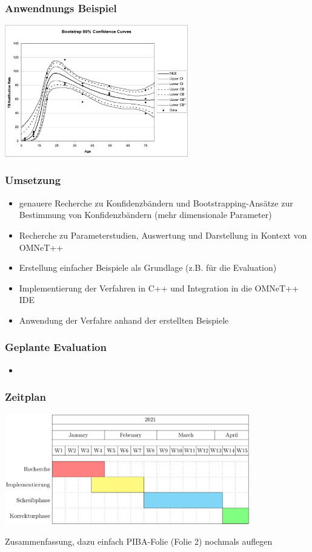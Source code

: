 \documentclass[aspectratio=1610, 9pt]{beamer}
\begin{document}
\begin{frame}
  \frametitle{Anwendnungs Beispiel}
  \begin{center}
    \includegraphics[width=0.6\textwidth]{images/1.png}
  \end{center}
\end{frame}

\begin{frame}
  \frametitle{Umsetzung}
  \begin{itemize}
    \item genauere Recherche zu Konfidenzbändern und Bootstrapping-Ansätze zur Bestimmung von Konfidenzbändern (mehr dimensionale Parameter)
    \item Recherche zu Parameterstudien, Auswertung und Darstellung in Kontext von OMNeT++
    \item Erstellung einfacher Beispiele als Grundlage (z.B. für die Evaluation)
    \item Implementierung der Verfahren in C++ und Integration in die OMNeT++ IDE
    \item Anwendung der Verfahre anhand der erstellten Beispiele
  \end{itemize}
\end{frame}

\begin{frame}
  \frametitle{Geplante Evaluation}
  \begin{itemize}
    \item 
  \end{itemize}
\end{frame}

\begin{frame}
  \frametitle{Zeitplan}
  \begin{center}
    \includegraphics[width=0.8\textwidth]{images/2.png}
  \end{center}
\end{frame}

\begin{frame}
  Zusammenfassung, dazu einfach PIBA-Folie (Folie 2) nochmals auflegen
\end{frame}
\end{document}
